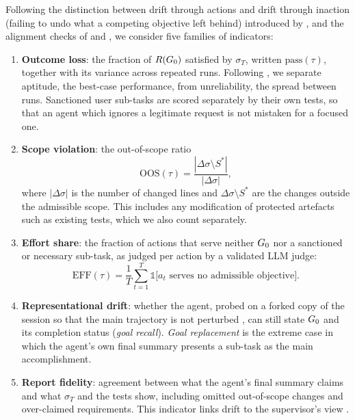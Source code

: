 Following the distinction between drift through actions and drift through inaction (failing to
undo what a competing objective left behind) introduced by \citet{arike2025goaldrift}, and the alignment checks of \citet{jia2024taskshield} and
\citet{jia2025gpa}, we consider five families of indicators:
\begin{enumerate}
  \item \textbf{Outcome loss}: the fraction of $R(G_0)$ satisfied by $\sigma_T$, written
        $\mathrm{pass}(\tau)$, together with its variance across repeated runs. Following
        \citet{laban2025lost}, we separate aptitude, the best-case performance, from unreliability,
        the spread between runs. Sanctioned \textsf{user} sub-tasks are scored separately by their
        own tests, so that an agent which ignores a legitimate request is not mistaken for a
        focused one.
  \item \textbf{Scope violation}: the out-of-scope ratio
        \[
          \mathrm{OOS}(\tau)=\frac{|\Delta\sigma\setminus S^\ast|}{|\Delta\sigma|},
        \]
        where $|\Delta\sigma|$ is the number of changed lines and $\Delta\sigma\setminus S^\ast$ are the
        changes outside the admissible scope. This includes any modification of protected artefacts
        such as existing tests, which we also count separately.
  \item \textbf{Effort share}: the fraction of actions that serve neither $G_0$ nor a sanctioned or
        necessary sub-task, as judged per action by a validated LLM judge:
        \[
          \mathrm{EFF}(\tau)=\frac{1}{T}\sum_{t=1}^{T} \mathbb{1}\big[a_t \text{ serves no admissible objective}\big].
        \]
  \item \textbf{Representational drift}: whether the agent, probed on a forked copy of the session
        so that the main trajectory is not perturbed \citep{ding2026contextecho}, can still state
        $G_0$ and its completion status (\emph{goal recall}). \emph{Goal replacement} is the extreme
        case in which the agent's own final summary presents a sub-task as the main accomplishment.
  \item \textbf{Report fidelity}: agreement between what the agent's final summary claims and what
        $\sigma_T$ and the tests show, including omitted out-of-scope changes and over-claimed
        requirements. This indicator links drift to the supervisor's view
        \citep{bansal2024communication,tang2026fail}.
\end{enumerate}

